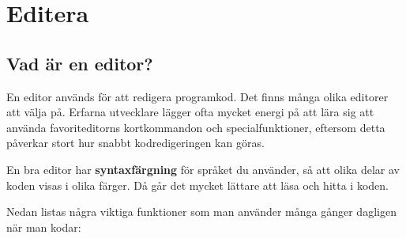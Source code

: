 
\chapter{Editera}\label{appendix:edit}
\section{Vad är en editor?}

En editor används för att redigera programkod. Det finns många olika editorer att välja på. Erfarna utvecklare lägger ofta mycket energi på att lära sig att använda favoriteditorns kortkommandon och specialfunktioner, eftersom detta påverkar stort hur snabbt kodredigeringen kan göras. 

En bra editor har \textbf{syntaxfärgning} för språket du använder, så att olika delar av koden visas i olika färger. Då går det mycket lättare att läsa och hitta i koden. 

Nedan listas några viktiga funktioner som man använder många gånger dagligen när man kodar:

